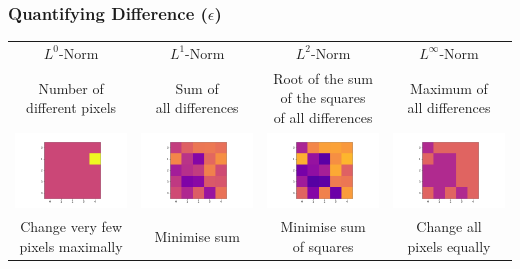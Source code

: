 \documentclass[10pt,usepdftitle=false,aspectratio=169]{beamer}
\begin{document}
\begin{frame}[fragile]
	\frametitle{Quantifying Difference ($\epsilon$)}

	\begin{tabular}{cccc}
		
	$L^0$-Norm & 	$L^1$-Norm & 	$L^2$-Norm & 	$L^\infty$-Norm \vspace{5pt} \\
	
	
	
	\shortstack{Number of \\ different pixels} & \shortstack{Sum of \\ all differences} & \shortstack{Root of the sum\\of the squares \\ of all differences} & \shortstack{Maximum of \\ all differences} \\
	
	\includegraphics[align=c,width=0.3\columnwidth]{plots/L0.png} &
	\includegraphics[align=c,width=0.3\columnwidth]{plots/L1.png} &
	\includegraphics[align=c,width=0.3\columnwidth]{plots/L2.png} &
	\includegraphics[align=c,width=0.3\columnwidth]{plots/Linf.png} 
	\\
	
	\shortstack{Change very few \\ pixels maximally}&Minimise sum&\shortstack{Minimise sum \\ of squares}&\shortstack{Change all \\ pixels equally}
	\end{tabular}
\end{frame}
\end{document}
